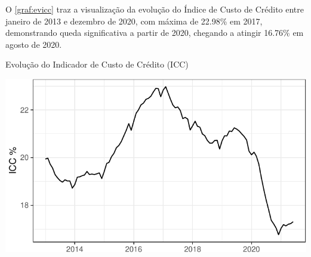 \documentclass[
  12pt,
  12pt,
  openright,
  oneside,
  a4paper,
  chapter=TITLE,
  section=TITLE,
  subsection=TITLE,
  subsubsection=TITLE,
  portugues,
  sumario=tradicional]{abntex2}
\begin{document}
O \autoref{graf:evicc} traz a visualização da evolução do Índice de Custo de Crédito entre janeiro de 2013 e dezembro de 2020, com máxima de 22.98\% em 2017, demonstrando queda significativa a partir de 2020, chegando a atingir 16.76\% em agosto de 2020.

\begin{grafico}[!hbtp]
\vspace{20pt}
\caption{Evolução do Indicador de Custo de Crédito (ICC)}
\vspace{-4mm}

\begin{center}\includegraphics{12-exportedfigures/ICC-1} \end{center}
\vspace{-3mm}
\label{graf:evicc}
\vspace{-2mm}
\end{grafico}
\end{document}

